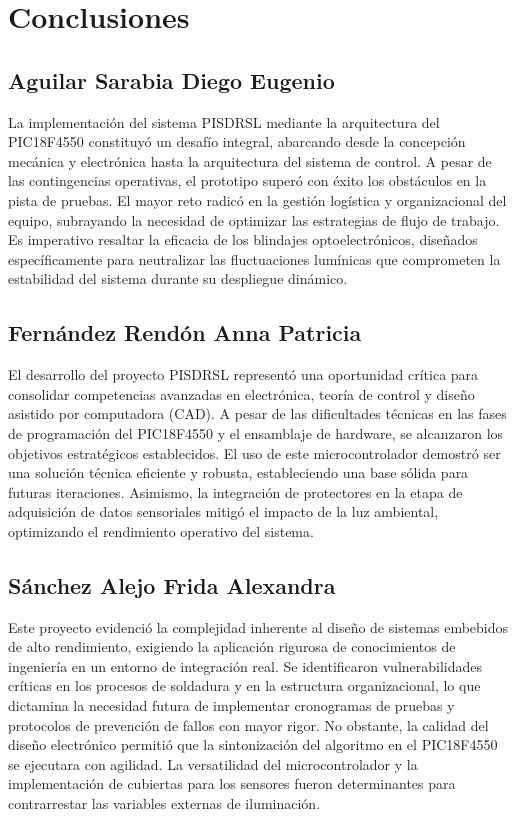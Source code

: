 \documentclass{article}
\begin{document}
\section{Conclusiones}
\subsection{Aguilar Sarabia Diego Eugenio}

La implementación del sistema PISDRSL mediante la arquitectura del PIC18F4550 constituyó un desafío integral, abarcando desde la concepción mecánica y electrónica hasta la arquitectura del sistema de control. A pesar de las contingencias operativas, el prototipo superó con éxito los obstáculos en la pista de pruebas. El mayor reto radicó en la gestión logística y organizacional del equipo, subrayando la necesidad de optimizar las estrategias de flujo de trabajo. Es imperativo resaltar la eficacia de los blindajes optoelectrónicos, diseñados específicamente para neutralizar las fluctuaciones lumínicas que comprometen la estabilidad del sistema durante su despliegue dinámico.

\subsection{Fernández Rendón Anna Patricia}
 
El desarrollo del proyecto PISDRSL representó una oportunidad crítica para consolidar competencias avanzadas en electrónica, teoría de control y diseño asistido por computadora (CAD). A pesar de las dificultades técnicas en las fases de programación del PIC18F4550 y el ensamblaje de hardware, se alcanzaron los objetivos estratégicos establecidos. El uso de este microcontrolador demostró ser una solución técnica eficiente y robusta, estableciendo una base sólida para futuras iteraciones. Asimismo, la integración de protectores en la etapa de adquisición de datos sensoriales mitigó el impacto de la luz ambiental, optimizando el rendimiento operativo del sistema.
 
\subsection{Sánchez Alejo Frida Alexandra}

 Este proyecto evidenció la complejidad inherente al diseño de sistemas embebidos de alto rendimiento, exigiendo la aplicación rigurosa de conocimientos de ingeniería en un entorno de integración real. Se identificaron vulnerabilidades críticas en los procesos de soldadura y en la estructura organizacional, lo que dictamina la necesidad futura de implementar cronogramas de pruebas y protocolos de prevención de fallos con mayor rigor. No obstante, la calidad del diseño electrónico permitió que la sintonización del algoritmo en el PIC18F4550 se ejecutara con agilidad. La versatilidad del microcontrolador y la implementación de cubiertas para los sensores fueron determinantes para contrarrestar las variables externas de iluminación.
\end{document}
